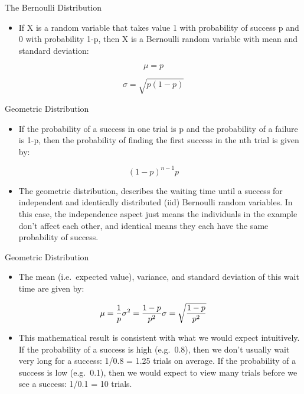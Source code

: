 \documentclass[
  ignorenonframetext,
]{beamer}
\providecommand{\tightlist}{%
  \setlength{\itemsep}{0pt}\setlength{\parskip}{0pt}}
\begin{document}
\begin{frame}{The Bernoulli Distribution}
\protect\hypertarget{the-bernoulli-distribution-2}{}

\begin{itemize}
\tightlist
\item
  If X is a random variable that takes value 1 with probability of
  success p and 0 with probability 1-p, then X is a Bernoulli random
  variable with mean and standard deviation:
\end{itemize}

\[ \mu = p\]

\[\sigma=\sqrt{p(1-p)}\]

\end{frame}

\begin{frame}{Geometric Distribution}
\protect\hypertarget{geometric-distribution}{}

\begin{itemize}
\tightlist
\item
  If the probability of a success in one trial is p and the probability
  of a failure is 1-p, then the probability of finding the first success
  in the nth trial is given by:
\end{itemize}

\[(1-p)^{n-1}p\]

\begin{itemize}
\tightlist
\item
  The geometric distribution, describes the waiting time until a success
  for independent and identically distributed (iid) Bernoulli random
  variables. In this case, the independence aspect just means the
  individuals in the example don't affect each other, and identical
  means they each have the same probability of success.
\end{itemize}

\end{frame}

\begin{frame}{Geometric Distribution}
\protect\hypertarget{geometric-distribution-1}{}

\begin{itemize}
\tightlist
\item
  The mean (i.e.~expected value), variance, and standard deviation of
  this wait time are given by:
\end{itemize}

\[\mu= \frac{1}{p} \\
\sigma^{2}= \frac{1-p}{p^{2}} \\
\sigma= \sqrt{\frac{1-p}{p^{2}}}\]

\begin{itemize}
\tightlist
\item
  This mathematical result is consistent with what we would expect
  intuitively. If the probability of a success is high (e.g.~0.8), then
  we don't usually wait very long for a success: 1/0.8 = 1.25 trials on
  average. If the probability of a success is low (e.g.~0.1), then we
  would expect to view many trials before we see a success: 1/0.1 = 10
  trials.
\end{itemize}

\end{frame}
\end{document}
